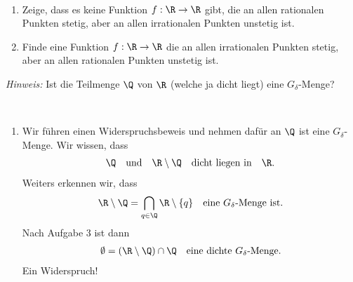 \begin{exercise}
\leavevmode \\
\begin{enumerate}[label = (\roman*)]
  \item Zeige, dass es keine Funktion $f: \R \rightarrow \R$ gibt, die an allen rationalen
  Punkten stetig, aber an allen irrationalen Punkten unstetig ist.
  \item Finde eine
 Funktion $f: \R \rightarrow \R$ die an allen irrationalen Punkten stetig,
 aber an allen rationalen Punkten unstetig ist.
\end{enumerate}
\textit{Hinweis:} Ist die Teilmenge $\Q$ von $\R$ (welche ja dicht liegt)
eine $G_{\delta}$-Menge?
\end{exercise}
\begin{solution}
\leavevmode \\
\begin{enumerate}[label = (\roman*)]
  \item Wir führen einen Widerspruchsbeweis und nehmen dafür an $\Q$ ist eine $G_\delta$-Menge. Wir wissen, dass
  \begin{align*}
    \Q \quad \textrm{und} \quad \R \setminus \Q \quad \textrm{dicht liegen in} \quad \R.
  \end{align*}
  Weiters erkennen wir, dass
  \begin{align*}
    \R \setminus \Q = \bigcap_{q \in \Q} \R \setminus \{q\} \quad \textrm{eine $G_\delta$-Menge ist.}
  \end{align*}
  Nach Aufgabe 3 ist dann
  \begin{align*}
    \emptyset = (\R \setminus \Q) \cap \Q \quad \textrm{eine dichte $G_\delta$-Menge.}
  \end{align*}
  Ein Widerspruch!


\end{enumerate}
\end{solution}
